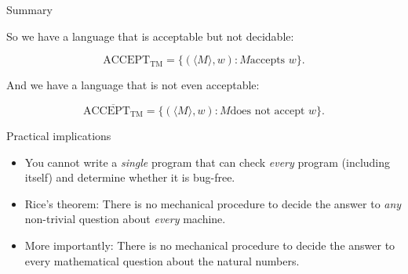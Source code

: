 \documentclass[12pt,compress]{beamer}
\begin{document}
\begin{frame}{Summary}

  So we have a language that is acceptable but not decidable:

  \begin{equation*}
    \text{ACCEPT}_{\text{TM}} = \{ (\langle M \rangle, w) : M \text{
      accepts } w\}.
  \end{equation*}

  \vskip 0.15in

  And we have a language that is not even acceptable:

  \begin{equation*}
    \overline{\text{ACCEPT}_{\text{TM}}} = \{ (\langle M \rangle, w) : M \text{
      does not accept } w\}.
  \end{equation*}

\end{frame}

\begin{frame}{Practical implications}

  \begin{itemize}

  \item You cannot write a \textit{single} program that can check \textit{every}
    program (including itself) and determine whether it is bug-free.

  \item Rice's theorem: There is no mechanical procedure to decide the
    answer to \textit{any} non-trivial question about \textit{every} machine.

  \item More importantly: There is no mechanical procedure to decide the
    answer to every mathematical question about the natural numbers.

  \end{itemize}

\end{frame}
\end{document}
